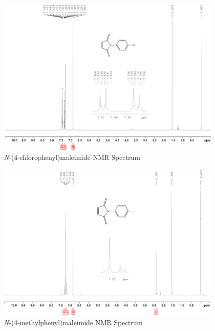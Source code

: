 \documentclass[11pt]{article}
\begin{document}
\begin{figure}[H]
    \centering
    \includegraphics[scale=0.105]{spectra/nmr9.2.png}
    \caption{\textit{N}-(4-chlorophenyl)maleimide NMR Spectrum}
\end{figure}
\begin{figure}[H]
    \centering
    \includegraphics[scale=0.105]{spectra/nmr10.2.png}
    \caption{\textit{N}-(4-methylphenyl)maleimide NMR Spectrum}
\end{figure}
\end{document}
